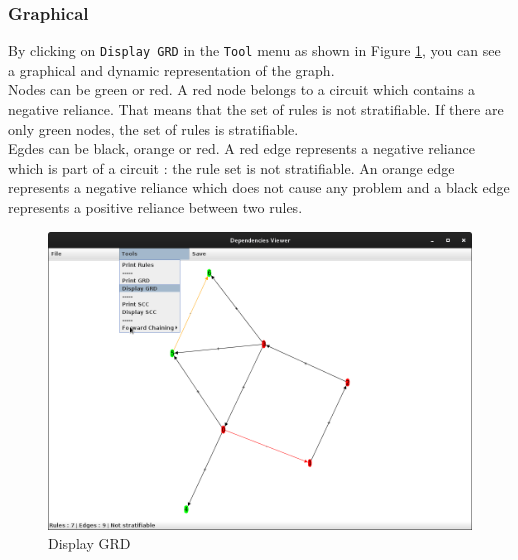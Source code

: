 \documentclass[a4paper, 10pt]{article}
\begin{document}
\subsubsection{Graphical}
By clicking on \verb=Display GRD= in the \verb=Tool= menu as shown in Figure \ref{fig5}, you can see a graphical and dynamic representation of the graph.\\
Nodes can be green or red. A red node belongs to a circuit which contains a negative reliance. That means that the set of rules is not stratifiable. If there are only green nodes, the set of rules is stratifiable.\\
Egdes can be black, orange or red. A red edge represents a negative reliance which is part of a circuit : the rule set is not stratifiable. An orange edge represents a negative reliance which does not cause any problem and a black edge represents a positive reliance between two rules.

\begin{figure}
\begin{center}
  \includegraphics[scale=0.25]{pics/fig5.png}
  \caption{Display GRD}
\end{center}
\label{fig5}
\end{figure}
\end{document}
